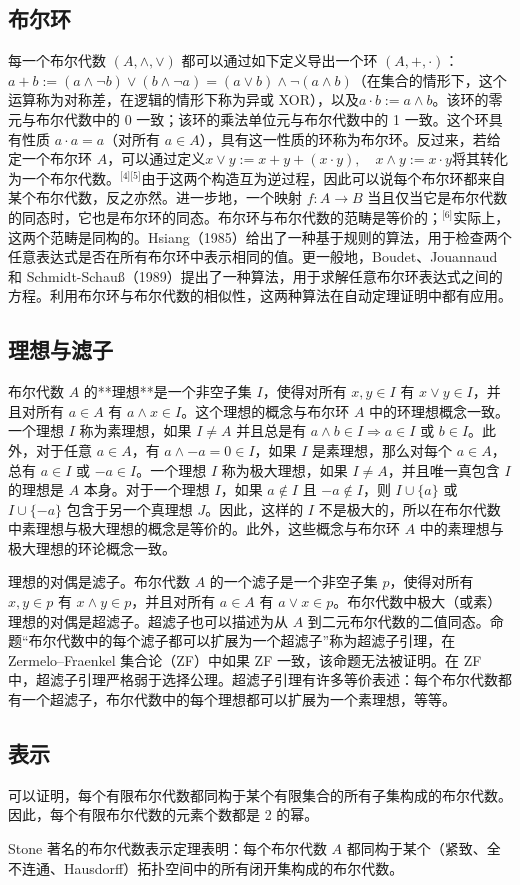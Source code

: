 \subsection{布尔环}
每一个布尔代数 $(A, \land, \lor)$ 都可以通过如下定义导出一个环 $(A, +, \cdot)$：$a + b := (a \land \lnot b) \lor (b \land \lnot a) = (a \lor b) \land \lnot(a \land b)$（在集合的情形下，这个运算称为对称差，在逻辑的情形下称为异或 XOR），以及$a \cdot b := a \land b$。该环的零元与布尔代数中的 0 一致；该环的乘法单位元与布尔代数中的 1 一致。这个环具有性质 $a \cdot a = a$（对所有 $a \in A$），具有这一性质的环称为布尔环。反过来，若给定一个布尔环 $A$，可以通过定义$x \lor y := x + y + (x \cdot y),\quad x \land y := x \cdot y$将其转化为一个布尔代数。\(^\text{[4][5]}\)由于这两个构造互为逆过程，因此可以说每个布尔环都来自某个布尔代数，反之亦然。进一步地，一个映射 $f : A \to B$ 当且仅当它是布尔代数的同态时，它也是布尔环的同态。布尔环与布尔代数的范畴是等价的；\(^\text{[6]}\)实际上，这两个范畴是同构的。Hsiang（1985）给出了一种基于规则的算法，用于检查两个任意表达式是否在所有布尔环中表示相同的值。更一般地，Boudet、Jouannaud 和 Schmidt-Schauß（1989）提出了一种算法，用于求解任意布尔环表达式之间的方程。利用布尔环与布尔代数的相似性，这两种算法在自动定理证明中都有应用。
\subsection{理想与滤子}
布尔代数 $A$ 的**理想**是一个非空子集 $I$，使得对所有 $x, y \in I$ 有 $x \lor y \in I$，并且对所有 $a \in A$ 有 $a \land x \in I$。这个理想的概念与布尔环 $A$ 中的环理想概念一致。一个理想 $I$ 称为素理想，如果 $I \neq A$ 并且总是有 $a \land b \in I \Rightarrow a \in I$ 或 $b \in I$。此外，对于任意 $a \in A$，有 $a \land -a = 0 \in I$，如果 $I$ 是素理想，那么对每个 $a \in A$，总有 $a \in I$ 或 $-a \in I$。一个理想 $I$ 称为极大理想，如果 $I \neq A$，并且唯一真包含 $I$ 的理想是 $A$ 本身。对于一个理想 $I$，如果 $a \notin I$ 且 $-a \notin I$，则 $I \cup \{a\}$ 或 $I \cup \{-a\}$ 包含于另一个真理想 $J$。因此，这样的 $I$ 不是极大的，所以在布尔代数中素理想与极大理想的概念是等价的。此外，这些概念与布尔环 $A$ 中的素理想与极大理想的环论概念一致。

理想的对偶是滤子。布尔代数 $A$ 的一个滤子是一个非空子集 $p$，使得对所有 $x, y \in p$ 有 $x \land y \in p$，并且对所有 $a \in A$ 有 $a \lor x \in p$。布尔代数中极大（或素）理想的对偶是超滤子。超滤子也可以描述为从 $A$ 到二元布尔代数的二值同态。命题“布尔代数中的每个滤子都可以扩展为一个超滤子”称为超滤子引理，在 Zermelo–Fraenkel 集合论（ZF）中如果 ZF 一致，该命题无法被证明。在 ZF 中，超滤子引理严格弱于选择公理。超滤子引理有许多等价表述：每个布尔代数都有一个超滤子，布尔代数中的每个理想都可以扩展为一个素理想，等等。
\subsection{表示}
可以证明，每个有限布尔代数都同构于某个有限集合的所有子集构成的布尔代数。因此，每个有限布尔代数的元素个数都是 2 的幂。

Stone 著名的布尔代数表示定理表明：每个布尔代数 $A$ 都同构于某个（紧致、全不连通、Hausdorff）拓扑空间中的所有闭开集构成的布尔代数。
